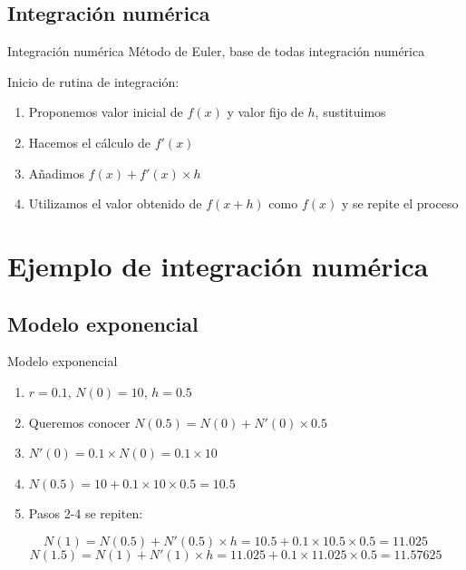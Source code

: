 \documentclass[
  11pt,
  ignorenonframetext,
]{beamer}
\begin{document}
\subsection{Integración numérica}\label{integraciuxf3n-numuxe9rica-1}

\begin{frame}{Integración numérica}
Método de Euler, base de todas integración numérica

Inicio de rutina de integración:

\begin{enumerate}
\item
  Proponemos valor inicial de \(f(x)\) y valor fijo de \(h\),
  sustituimos
\item
  Hacemos el cálculo de \(f'(x)\)
\item
  Añadimos \(f(x) + f'(x) \times h\)
\item
  Utilizamos el valor obtenido de \(f(x + h)\) como \(f(x)\) y se repite
  el proceso
\end{enumerate}
\end{frame}

\section{Ejemplo de integración
numérica}\label{ejemplo-de-integraciuxf3n-numuxe9rica}

\subsection{Modelo exponencial}\label{modelo-exponencial-1}

\begin{frame}{Modelo exponencial}
\begin{enumerate}
\item
  \(r = 0.1\), \(N(0) = 10\), \(h = 0.5\)
\item
  Queremos conocer \(N(0.5) = N(0) + N'(0) \times 0.5\)
\item
  \(N'(0) = 0.1 \times N(0) = 0.1 \times 10\)
\item
  \(N(0.5) = 10 + 0.1 \times 10 \times 0.5 = 10.5\)
\item
  Pasos 2-4 se repiten:
\end{enumerate}

\[N(1) = N(0.5) + N'(0.5) \times h = 10.5 + 0.1\times 10.5 \times 0.5 = 11.025\]
\[N(1.5) = N(1) + N'(1) \times h = 11.025 + 0.1\times 11.025 \times 0.5 = 11.57625\]
\end{frame}
\end{document}
